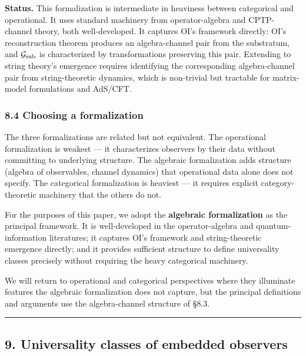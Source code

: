 \documentclass[
]{article}
\begin{document}
\textbf{Status.} This formalization is intermediate in heaviness between
categorical and operational. It uses standard machinery from
operator-algebra and CPTP-channel theory, both well-developed. It
captures OI's framework directly: OI's reconstruction theorem produces
an algebra-channel pair from the substratum, and
\(\mathcal{G}_{\rm sub}\) is characterized by transformations preserving
this pair. Extending to string theory's emergence requires identifying
the corresponding algebra-channel pair from string-theoretic dynamics,
which is non-trivial but tractable for matrix-model formulations and
AdS/CFT.

\hypertarget{choosing-a-formalization}{%
\subsubsection{8.4 Choosing a
formalization}\label{choosing-a-formalization}}

The three formalizations are related but not equivalent. The operational
formalization is weakest --- it characterizes observers by their data
without committing to underlying structure. The algebraic formalization
adds structure (algebra of observables, channel dynamics) that
operational data alone does not specify. The categorical formalization
is heaviest --- it requires explicit category-theoretic machinery that
the others do not.

For the purposes of this paper, we adopt the \textbf{algebraic
formalization} as the principal framework. It is well-developed in the
operator-algebra and quantum-information literatures; it captures OI's
framework and string-theoretic emergence directly; and it provides
sufficient structure to define universality classes precisely without
requiring the heavy categorical machinery.

We will return to operational and categorical perspectives where they
illuminate features the algebraic formalization does not capture, but
the principal definitions and arguments use the algebra-channel
structure of §8.3.

\begin{center}\rule{0.5\linewidth}{0.5pt}\end{center}

\hypertarget{universality-classes-of-embedded-observers}{%
\subsection{9. Universality classes of embedded
observers}\label{universality-classes-of-embedded-observers}}
\end{document}
